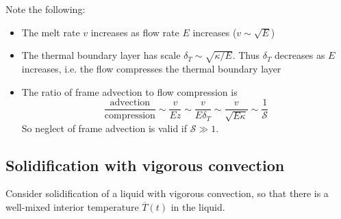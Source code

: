 \documentclass{jknotes}
\begin{document}
Note the following:
\begin{itemize}
	\item The melt rate $v$ increases as flow rate $E$ increases ($v \sim
		\sqrt{E}$)
	\item The thermal boundary layer has scale $\delta_T \sim \sqrt{\kappa/E}$.
		Thus $\delta_T$ decreases as $E$ increases, i.e. the flow compresses
		the thermal boundary layer
	\item The ratio of frame advection to flow compression is
		\begin{equation}
			\frac{\text{advection}}{\text{compression}} \sim \frac{v}{Ez} \sim
			\frac{v}{E\delta_T} \sim \frac{v}{\sqrt{E\kappa}} \sim
			\frac{1}{\mathcal{S}}
		\end{equation}
		So neglect of frame advection is valid if $\mathcal{S} \gg 1$.
\end{itemize}

\subsection{Solidification with vigorous convection}
Consider solidification of a liquid with vigorous convection, so that there is
a well-mixed interior temperature $\overline{T}(t)$ in the liquid.
\begin{center}
\end{center}
\end{document}
